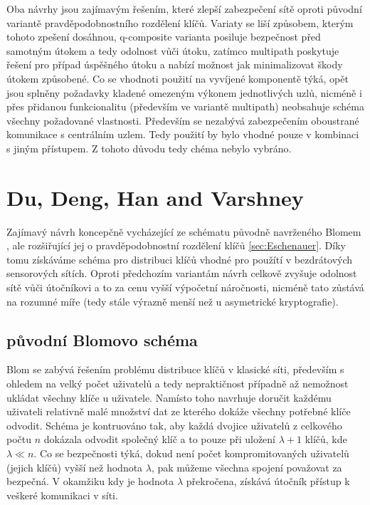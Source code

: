 \documentclass[11pt,final,twoside]{fithesis2}
\begin{document}
Oba návrhy jsou zajímavým řešením, které zlepší zabezpečení sítě oproti původní variantě pravděpodobnostního rozdělení klíčů. Variaty se liší způsobem, kterým tohoto zpešení dosáhnou, q-composite 
varianta posiluje bezpečnost před samotným útokem a tedy odolnost vůči útoku, zatímco multipath poskytuje řešení pro případ úspěšného útoku a nabízí možnost jak minimalizovat škody útokem způsobené.
Co se vhodnoti použití na vyvíjené komponentě týká, opět jsou splněny požadavky kladené omezeným výkonem jednotlivých uzlů, nicméně i přes přidanou funkcionalitu (především ve 
variantě multipath) neobsahuje schéma všechny požadované vlastnosti. Především se nezabývá zabezpečením oboustrané komunikace s centrálním uzlem. Tedy použití by bylo vhodné pouze v kombinaci 
s jiným přístupem. Z tohoto důvodu tedy chéma nebylo vybráno. 


\section{Du, Deng, Han and Varshney}
Zajímavý návrh \cite{Du2005} koncepčně vycházející ze schématu původně navrženého Blomem \cite{Blom1985}, ale rozšiřující jej o pravděpodobnostní rozdělení klíčů \ref{sec:Eschenauer}.
Díky tomu získáváme schéma pro distribuci klíčů vhodné pro použítí v bezdrátových sensorových sítích. Oproti předchozím variantám návrh celkově zvyšuje odolnost sítě vůči 
útočníkovi a to za cenu vyšší výpočetní náročnosti, nicméně tato zůstává na rozumné míře (tedy stále výrazně menší než u asymetrické kryptografie). 

\subsection{původní Blomovo schéma}
Blom \cite{Blom1985} se zabývá řešením problému distribuce klíčů v klasické síti, především s ohledem na velký počet uživatelů a tedy nepraktičnost případně až nemožnost ukládat všechny klíče u uživatele.
Namísto toho navrhuje doručit každému uživateli relativně malé množství dat ze kterého dokáže všechny potřebné klíče odvodit. Schéma je kontruováno tak, aby každá dvojice uživatelů z celkového počtu $n$
dokázala odvodit společný klíč a to pouze při uložení $\lambda + 1$ klíčů, kde $\lambda \ll n$. Co se bezpečnosti týká, dokud není počet kompromitovaných uživatelů (jejich klíčů) vyšší než hodnota 
$\lambda$, pak můžeme všechna spojení považovat za bezpečná. V okamžiku kdy je hodnota $\lambda$ překročena, získává útočník přístup k veškeré komunikaci v síti. 
\end{document}
